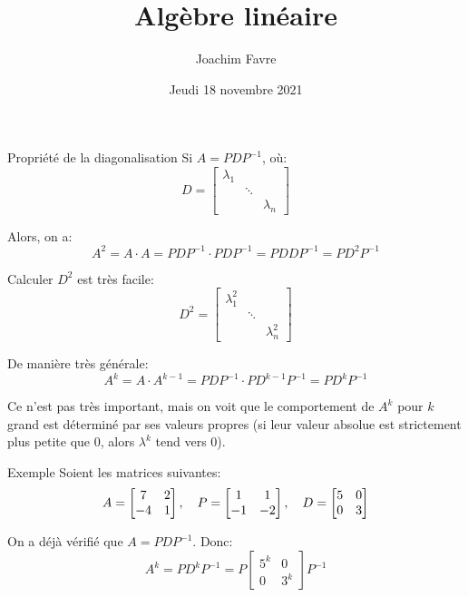 \documentclass[a4paper]{article}
\title{Algèbre linéaire}
\author{Joachim Favre}
\date{Jeudi 18 novembre 2021}
\begin{document}
\maketitle


\begin{parag}{Propriété de la diagonalisation}
    Si $A = PDP^{-1}$, où: 
    \[D = \begin{bmatrix} \lambda_1 & & \\ & \ddots & \\ &  & \lambda_n \end{bmatrix} \]
    
    Alors, on a: 
    \[A^2 = A\cdot A = PDP^{-1} \cdot PDP^{-1} = PDDP^{-1}= PD^2 P^{-1} \]
    
    Calculer $D^2$ est très facile: 
    \[D^2 = \begin{bmatrix} \lambda_1^2 &  &  \\  & \ddots &  \\  &  & \lambda_n^2 \end{bmatrix} \]
    
    De manière très générale: 
    \[A^k = A\cdot A^{k-1} = P D P^{-1} \cdot PD^{k-1}P^{-1} = PD^{k}P^{-1}\]
    
    Ce n'est pas très important, mais on voit que le comportement de $A^k$ pour $k$ grand est déterminé par ses valeurs propres (si leur valeur absolue est strictement plus petite que 0, alors $\lambda^k$ tend vers 0). 
\end{parag}

\begin{parag}{Exemple}
    Soient les matrices suivantes: 
    \[A = \begin{bmatrix} 7 & 2 \\ -4 & 1 \end{bmatrix}, \quad P = \begin{bmatrix} 1 & 1 \\ -1 & -2 \end{bmatrix}, \quad D = \begin{bmatrix} 5 & 0 \\ 0 & 3 \end{bmatrix} \]
    
    On a déjà vérifié que $A = PDP^{-1}$. Donc: 
    \[A^k = PD^k P^{-1} = P \begin{bmatrix} 5^k & 0 \\ 0 & 3^k \end{bmatrix} P^{-1}\]
\end{parag}
\end{document}

